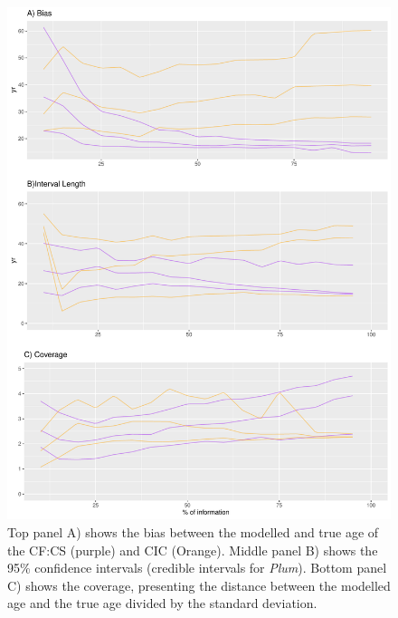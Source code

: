 \documentclass [10pt] {article}
\begin{document}
\begin{figure}
	\begin{centering}
		\includegraphics[width = 13cm]{AccPrec-appendix.pdf}
		\caption{ Top panel A) shows the bias between the modelled and true age of the CF:CS (purple) and CIC (Orange). Middle panel B) shows the 95\% confidence intervals (credible intervals for \textit{Plum}). Bottom panel C) shows the coverage, presenting the distance between the modelled age and the true age divided by the standard deviation. }
		\label{fig:CIC-CFCS}
	\end{centering}
\end{figure}
\end{document}
